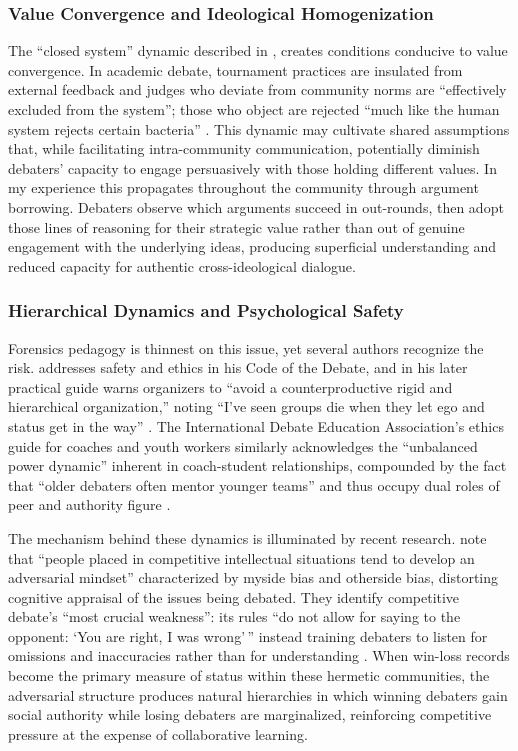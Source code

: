 \documentclass[12pt]{article}
\begin{document}
\subsubsection{Value Convergence and Ideological Homogenization}

The ``closed system'' dynamic described in \textcite{combs2002applying}, creates conditions conducive to value convergence. In academic debate, tournament practices are insulated from external feedback and judges who deviate from community norms are ``effectively excluded from the system''; those who object are rejected ``much like the human system rejects certain bacteria'' \parencite[p.~40]{combs2002applying}. This dynamic may cultivate shared assumptions that, while facilitating intra-community communication, potentially diminish debaters' capacity to engage persuasively with those holding different values. In my experience this propagates throughout the community through argument borrowing. Debaters observe which arguments succeed in out-rounds, then adopt those lines of reasoning for their strategic value rather than out of genuine engagement with the underlying ideas, producing superficial understanding and reduced capacity for authentic cross-ideological dialogue.


\subsubsection{Hierarchical Dynamics and Psychological Safety}

Forensics pedagogy is thinnest on this issue, yet several authors recognize the risk. \textcite{snider1999code} addresses safety and ethics in his Code of the Debate, and in his later practical guide warns organizers to ``avoid a counterproductive rigid and hierarchical organization,'' noting ``I've seen groups die when they let ego and status get in the way'' \parencite[p.~36]{snider2014sparking}. The International Debate Education Association's ethics guide for coaches and youth workers similarly acknowledges the ``unbalanced power dynamic'' inherent in coach-student relationships, compounded by the fact that ``older debaters often mentor younger teams'' and thus occupy dual roles of peer and authority figure \parencite{idea2024ethics}.

The mechanism behind these dynamics is illuminated by recent research. \textcite{prussikora2025cracovian} note that ``people placed in competitive intellectual situations tend to develop an adversarial mindset'' characterized by myside bias and otherside bias, distorting cognitive appraisal of the issues being debated. They identify competitive debate's ``most crucial weakness'': its rules ``do not allow for saying to the opponent: `You are right, I was wrong'\,'' instead training debaters to listen for omissions and inaccuracies rather than for understanding \parencite[p.~1474]{prussikora2025cracovian}. When win-loss records become the primary measure of status within these hermetic communities, the adversarial structure produces natural hierarchies in which winning debaters gain social authority while losing debaters are marginalized, reinforcing competitive pressure at the expense of collaborative learning.
\end{document}
